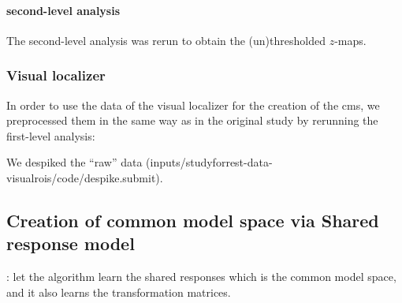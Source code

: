 \paragraph{second-level analysis}


The second-level analysis was rerun to obtain the (un)thresholded $z$-maps.


\subsubsection{Visual localizer}
In order to use the data of the visual localizer for the creation of the
\ac{cms}, we preprocessed them in the same way as in the original study
\citep{sengupta2016extension} by rerunning the first-level analysis:

We despiked the ``raw'' data
(inputs/studyforrest-data-visualrois/code/despike.submit).


\subsection{Creation of common model space via Shared response model}

\citep{chen2015reduced}: let the algorithm learn the shared responses which is
the common model space, and it also learns the transformation matrices.
%



